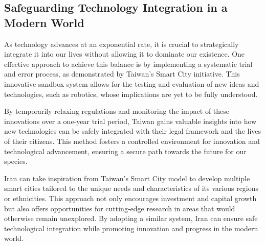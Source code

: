 \documentclass{IEEEtran}
\begin{document}
\subsection{Safeguarding Technology Integration in a Modern World}

As technology advances at an exponential rate, it is crucial to strategically integrate it into our lives without allowing it to dominate our existence. One effective approach to achieve this balance is by implementing a systematic trial and error process, as demonstrated by Taiwan's Smart City initiative. This innovative sandbox system allows for the testing and evaluation of new ideas and technologies, such as robotics, whose implications are yet to be fully understood.

By temporarily relaxing regulations and monitoring the impact of these innovations over a one-year trial period, Taiwan gains valuable insights into how new technologies can be safely integrated with their legal framework and the lives of their citizens. This method fosters a controlled environment for innovation and technological advancement, ensuring a secure path towards the future for our species.

Iran can take inspiration from Taiwan's Smart City model to develop multiple smart cities tailored to the unique needs and characteristics of its various regions or ethnicities. This approach not only encourages investment and capital growth but also offers opportunities for cutting-edge research in areas that would otherwise remain unexplored. By adopting a similar system, Iran can ensure safe technological integration while promoting innovation and progress in the modern world.


\end{document}
